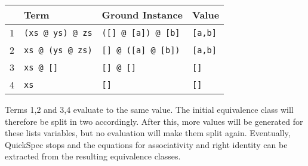 \begin{tabularx}{\textwidth}{l  X  X  X}
\\
 & Term & Ground Instance & Value \\
 \hline
1 \quad &\texttt{(xs @ ys) @ zs} & \texttt{([] @ [a]) @ [b]} & \texttt{[a,b]} \\
2 \quad&\texttt{xs @ (ys @ zs)} &\texttt{[] @ ([a] @ [b])} & \texttt{[a,b]}\\
3 \quad&\texttt{xs @ []} & \texttt{[] @ []} & \texttt{[]} \\
4 \quad &\texttt{xs} &\texttt{[]} & \texttt{[]} \\
\end{tabularx}
Terms 1,2  and 3,4 evaluate to the same value. The initial equivalence class will therefore be split in two accordingly.
After this, more values will be generated for these lists variables, but no evaluation will make
them split again. Eventually, QuickSpec stops and the equations for
associativity and right identity can be extracted from the resulting equivalence classes.


